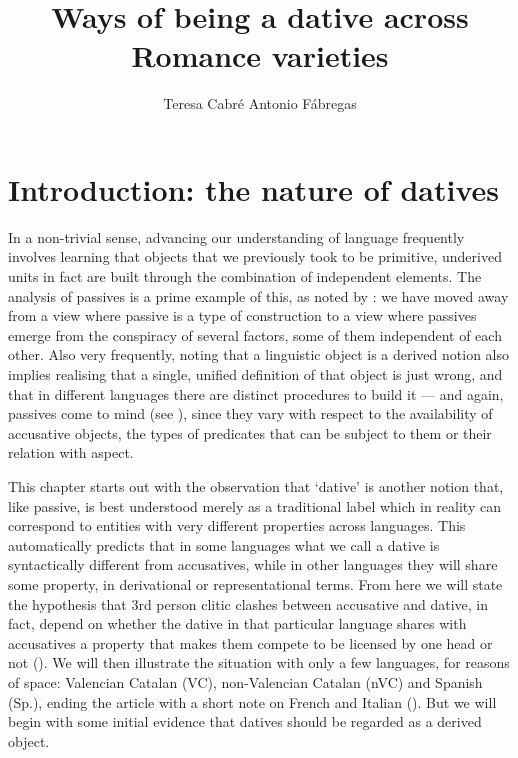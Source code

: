 \documentclass[output=paper,modfonts,nonflat,newtxmath,colorlinks,citecolor=brown]{langsci/langscibook}
\author{Teresa Cabré\affiliation{CLT-Universitat Autònoma de Barcelona}\lastand
Antonio Fábregas\affiliation{University of Tromsø-Norway’s Arctic University}}
\title{Ways of being a dative across Romance varieties}
\begin{document}
\maketitle 

\section{Introduction: the nature of datives} %
\label{sec:cabre:1}

In a non-trivial sense, advancing our understanding of language frequently involves learning that objects that we previously took to be primitive, underived units in fact are built through the combination of independent elements. The analysis of passives is a prime example of this, as noted by \citet{Williams2015}: we have moved away from a view where passive is a type of construction to a view where passives emerge from the conspiracy of several factors, some of them independent of each other. Also very frequently, noting that a linguistic object is a derived notion also implies realising that a single, unified definition of that object is just wrong, and that in different languages there are distinct procedures to build it — and again, passives come to mind (see \citealt{Croft2017}), since they vary with respect to the availability of accusative objects, the types of predicates that can be subject to them or their relation with aspect. 

This chapter starts out with the observation that ‘dative’ is another notion that, like passive, is best understood merely as a traditional label which in reality can correspond to entities with very different properties across languages. This automatically predicts that in some languages what we call a dative is syntactically different from accusatives, while in other languages they will share some property, in derivational or representational terms. From here we will state the hypothesis that 3rd person clitic clashes between accusative and dative, in fact, depend on whether the dative in that particular language shares with accusatives a property that makes them compete to be licensed by one head or not (). We will then illustrate the situation with only a few languages, for reasons of space: Valencian Catalan (VC), non-Valencian Catalan (nVC) and Spanish (Sp.), ending the article with a short note on French and Italian (). But we will begin with some initial evidence that datives should be regarded as a derived object.
\end{document}

